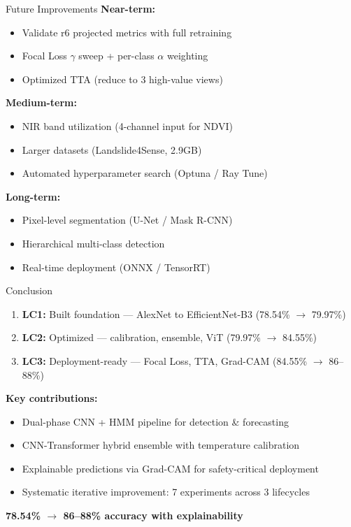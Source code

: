 \documentclass[aspectratio=169]{beamer}
\begin{document}
\begin{frame}{Future Improvements}
    \textbf{Near-term:}
    \begin{itemize}
        \item Validate r6 projected metrics with full retraining
        \item Focal Loss $\gamma$ sweep + per-class $\alpha$ weighting
        \item Optimized TTA (reduce to 3 high-value views)
    \end{itemize}

    \vspace{0.3cm}
    \textbf{Medium-term:}
    \begin{itemize}
        \item NIR band utilization (4-channel input for NDVI)
        \item Larger datasets (Landslide4Sense, 2.9GB)
        \item Automated hyperparameter search (Optuna / Ray Tune)
    \end{itemize}

    \vspace{0.3cm}
    \textbf{Long-term:}
    \begin{itemize}
        \item Pixel-level segmentation (U-Net / Mask R-CNN)
        \item Hierarchical multi-class detection
        \item Real-time deployment (ONNX / TensorRT)
    \end{itemize}
\end{frame}

\begin{frame}{Conclusion}
    \begin{enumerate}
        \item \textbf{LC1:} Built foundation --- AlexNet to EfficientNet-B3 (78.54\% $\to$ 79.97\%)
        \item \textbf{LC2:} Optimized --- calibration, ensemble, ViT (79.97\% $\to$ 84.55\%)
        \item \textbf{LC3:} Deployment-ready --- Focal Loss, TTA, Grad-CAM (84.55\% $\to$ 86--88\%)
    \end{enumerate}

    \vspace{0.5cm}
    \textbf{Key contributions:}
    \begin{itemize}
        \item Dual-phase CNN + HMM pipeline for detection \& forecasting
        \item CNN-Transformer hybrid ensemble with temperature calibration
        \item Explainable predictions via Grad-CAM for safety-critical deployment
        \item Systematic iterative improvement: 7 experiments across 3 lifecycles
    \end{itemize}

    \vspace{0.3cm}
    \centering
    \textbf{78.54\% $\to$ 86--88\% accuracy with explainability}
\end{frame}
\end{document}
